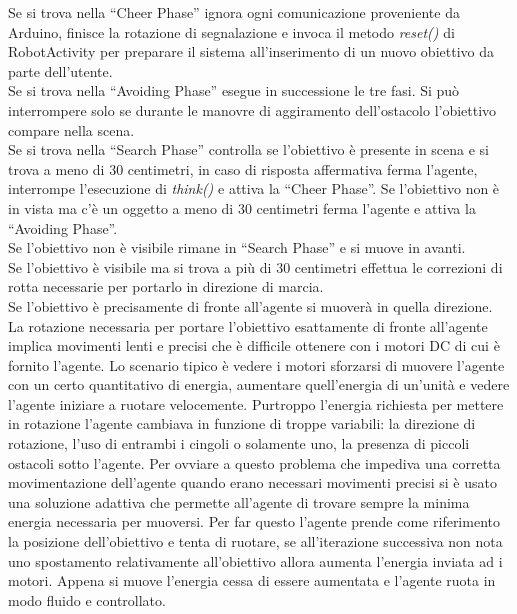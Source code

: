 Se si trova nella ``Cheer Phase'' ignora ogni comunicazione proveniente da 
Arduino, finisce la rotazione di segnalazione e invoca il metodo \emph{reset()} di 
RobotActivity per preparare il sistema all'inserimento di un nuovo obiettivo da 
parte dell'utente.\\
Se si trova nella ``Avoiding Phase'' esegue in successione le tre fasi. 
Si può interrompere solo se durante le manovre di aggiramento dell'ostacolo
l'obiettivo compare nella scena.\\
Se si trova nella ``Search Phase'' controlla se l'obiettivo è presente in scena e 
si trova a meno di 30 centimetri, in caso di risposta affermativa ferma l'agente,
interrompe l'esecuzione di \emph{think()} e attiva la ``Cheer Phase''. 
Se l'obiettivo non è in vista ma c'è un oggetto a meno di 30 centimetri ferma l'agente
e attiva la ``Avoiding Phase''.\\
Se l'obiettivo non è visibile rimane in ``Search Phase'' e si muove in avanti.\\
Se l'obiettivo è visibile ma si trova a più di 30 centimetri effettua le correzioni di rotta
necessarie per portarlo in direzione di marcia.\\
Se l'obiettivo è precisamente di fronte all'agente si muoverà in quella direzione.\\ 
La rotazione necessaria per portare l'obiettivo esattamente di fronte all'agente 
implica movimenti lenti e precisi che è difficile ottenere con i motori DC di cui è
fornito l'agente. Lo scenario tipico è vedere i motori sforzarsi di muovere l'agente
con un certo quantitativo di energia, aumentare quell'energia di un'unità e vedere 
l'agente iniziare a ruotare velocemente. Purtroppo l'energia richiesta per 
mettere in rotazione l'agente cambiava in funzione di troppe variabili: 
la direzione di rotazione, l'uso di entrambi i cingoli o solamente uno, 
la presenza di piccoli ostacoli sotto l'agente. Per ovviare a questo problema che impediva 
una corretta movimentazione dell'agente quando erano necessari movimenti precisi 
si è usato una soluzione adattiva che permette all'agente di trovare sempre la 
minima energia necessaria per muoversi. Per far questo l'agente prende come riferimento 
la posizione dell'obiettivo e tenta di ruotare, se all'iterazione successiva 
non nota uno spostamento relativamente all'obiettivo allora aumenta 
l'energia inviata ad i motori. Appena si muove l'energia cessa di essere 
aumentata e l'agente ruota in modo fluido e controllato.

